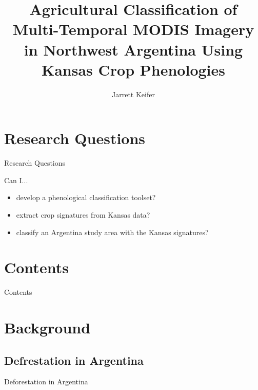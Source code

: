 \documentclass[compress]{beamer}
\title{Agricultural Classification of Multi-Temporal MODIS Imagery in Northwest Argentina Using Kansas Crop Phenologies}
\subtitle{}
\date{\formatdate{17}{9}{2014}}
\author{Jarrett Keifer}
\institute{Department of Geography}%
\begin{document}

\maketitle



\section*{Research Questions}

\begin{frame}{Research Questions}

Can I...

\begin{itemize}
  \item<1-> develop a phenological classification toolset?
  \item<2-> extract crop signatures from Kansas data?
  \item<3-> classify an Argentina study area with the Kansas signatures?
\end{itemize}
\end{frame}


\section*{Contents}
\begin{frame}{Contents}
	\tableofcontents[hideallsubsections]
\end{frame}



\section{Background}

\subsection{Defrestation in Argentina}
\begin{frame}{Deforestation in Argentina}
	
\end{frame}
\end{document}

